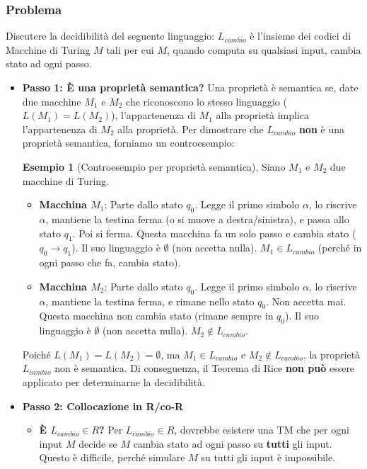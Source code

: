 \documentclass[a4paper]{article}
\theoremstyle{definition} %
\newtheorem{example}{Esempio}
\begin{document}
\subsubsection{Problema}
Discutere la decidibilità del seguente linguaggio: $L_{cambio}$ è l'insieme dei codici di Macchine di Turing $M$ tali per cui $M$, quando computa su qualsiasi input, cambia stato ad ogni passo.
\begin{itemize}
    \item \textbf{Passo 1: È una proprietà semantica?}
    Una proprietà è semantica se, date due macchine $M_1$ e $M_2$ che riconoscono lo stesso linguaggio ($L(M_1) = L(M_2)$), l'appartenenza di $M_1$ alla proprietà implica l'appartenenza di $M_2$ alla proprietà.
    Per dimostrare che $L_{cambio}$ \textbf{non} è una proprietà semantica, forniamo un controesempio:
    \begin{example}[Controesempio per proprietà semantica]
        Siano $M_1$ e $M_2$ due macchine di Turing.
        \begin{itemize}
            \item \textbf{Macchina $M_1$}:
            Parte dallo stato $q_0$. Legge il primo simbolo $\alpha$, lo riscrive $\alpha$, mantiene la testina ferma (o si muove a destra/sinistra), e passa allo stato $q_1$. Poi si ferma.
            Questa macchina fa un solo passo e cambia stato ($q_0 \to q_1$). Il suo linguaggio è $\emptyset$ (non accetta nulla). $M_1 \in L_{cambio}$ (perché in ogni passo che fa, cambia stato).
            \item \textbf{Macchina $M_2$}:
            Parte dallo stato $q_0$. Legge il primo simbolo $\alpha$, lo riscrive $\alpha$, mantiene la testina ferma, e rimane nello stato $q_0$. Non accetta mai.
            Questa macchina non cambia stato (rimane sempre in $q_0$). Il suo linguaggio è $\emptyset$ (non accetta nulla). $M_2 \notin L_{cambio}$.
        \end{itemize}
        Poiché $L(M_1) = L(M_2) = \emptyset$, ma $M_1 \in L_{cambio}$ e $M_2 \notin L_{cambio}$, la proprietà $L_{cambio}$ non è semantica. Di conseguenza, il Teorema di Rice \textbf{non può} essere applicato per determinarne la decidibilità.
    \end{example}

    \item \textbf{Passo 2: Collocazione in R/co-R}
    \begin{itemize}
        \item \textbf{È $L_{cambio} \in R$?}
        Per $L_{cambio} \in R$, dovrebbe esistere una TM che per ogni input $M$ decide se $M$ cambia stato ad ogni passo su \textbf{tutti} gli input. Questo è difficile, perché simulare $M$ su tutti gli input è impossibile.


\end{itemize}
\end{itemize}
\end{document}
